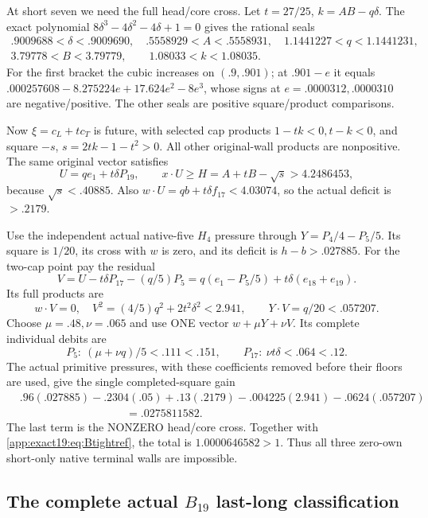At short seven we need the full
head/core cross.
Let \(t=27/25\), \(k=AB-q\delta\).
The exact polynomial
\(8\delta^3-4\delta^2-4\delta+1=0\)
gives the rational seals
\[
\begin{gathered}
 .9009688<\delta<.9009690,\quad
 .5558929<A<.5558931,\quad
 1.1441227<q<1.1441231,\\
 3.79778<B<3.79779,\qquad1.08033<k<1.08035 .
\end{gathered}
\]
For the first bracket the cubic
increases on \((.9,.901)\);
at \(.901-e\) it equals
\(.000257608-8.275224e+17.624e^2-8e^3\),
whose signs at \(e=.0000312,.0000310\)
are negative/positive.
The other seals are positive
square/product comparisons.

Now \(\xi=c_L+t c_T\) is future,
with selected cap products
\(1-tk<0,t-k<0\), and square
\(-s\), \(s=2tk-1-t^2>0\).
All other original-wall products
are nonpositive.
The same original vector satisfies
\[
 U=qe_1+t\delta P_{19},\qquad
 x\cdot U\ge H=A+tB-\sqrt s>4.2486453 ,
\]
because \(\sqrt s<.40885\).
Also \(w\cdot U=qb+t\delta f_{17}<4.03074\),
so the actual deficit is \(>.2179\).

Use the independent actual native-five
\(H_4\) pressure through
\(Y=P_4/4-P_5/5\).
Its square is \(1/20\), its cross
with \(w\) is zero, and its deficit
is \(h-b>.027885\).
For the two-cap point pay the
residual
\[
 V=U-t\delta P_{17}-(q/5)P_5
        =q(e_1-P_5/5)+t\delta(e_{18}+e_{19}).
\]
Its full products are
\[
 w\cdot V=0,\quad
 V^2=(4/5)q^2+2t^2\delta^2<2.941,\qquad
                         Y\cdot V=q/20<.057207 .
\]
Choose \(\mu=.48,\nu=.065\)
and use ONE vector \(w+\mu Y+\nu V\).
Its complete individual debits are
\[
        P_5:\ (\mu+\nu q)/5<.111<.151,\qquad
        P_{17}:\ \nu t\delta<.064<.12 .
\]
The actual primitive pressures,
with these coefficients removed
before their floors are used,
give the single completed-square
gain
\[
\begin{split}
 &.96(.027885)-.2304(.05)
  +.13(.2179)-.004225(2.941)-.0624(.057207)\\
 &\hspace{4cm}=.0275811582 .
\end{split}
\]
The last term is the NONZERO
head/core cross.
Together with
\eqref{app:exact19:eq:Btightref},
the total is \(1.0000646582>1\).
Thus all three zero-own short-only
native terminal walls are impossible.


\subsection{The complete actual \(B_{19}\) last-long classification}
\label{app:exact19:Blastlong}

